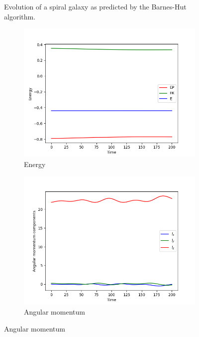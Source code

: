 \begin{figure}[htp]
    \caption{Evolution of a spiral galaxy as predicted by the Barnes-Hut algorithm.}
    \label{fig:spiral-galaxy-evolution-bh}
\end{figure}

\begin{figure}[htp]
    \centering
    \begin{subfigure}[b]{0.45\textwidth}
        \centering
        \includegraphics[width=\textwidth]{chapters/results/img/bh-galaxy/energy.png}
        \caption{Energy}
        \label{fig:physical-quantities-bh-sub1}
    \end{subfigure}
    \hfill
    \begin{subfigure}[b]{0.45\textwidth}
        \centering
        \includegraphics[width=\textwidth]{chapters/results/img/bh-galaxy/angular-momentum.png}
        \caption{Angular momentum}
        \label{fig:physical-quantities-bh-sub2}
    \end{subfigure}


\end{figure}
